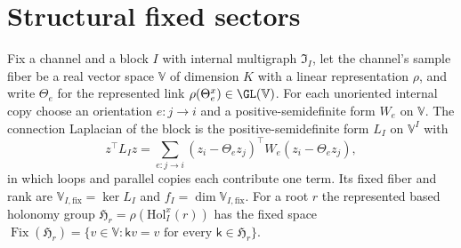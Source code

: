 \section{Structural fixed sectors}
\label{sec:cg-partial}

Fix a channel and a block $I$ with internal multigraph $\mathfrak I_I$, let the channel's sample fiber be
a real vector space $\mathbb V$ of dimension $K$ with a linear representation $\rho$, and write $\Theta_e$ for the
represented link $\rho(\Theta^x_e)\in\GL(\mathbb V)$. For each unoriented internal copy choose an orientation
$e:j\to i$ and a positive-semidefinite form $W_e$ on $\mathbb V$. The connection Laplacian of the block is the
positive-semidefinite form $L_I$ on $\mathbb V^I$ with
\begin{equation}
z^\top L_Iz=\sum_{e:j\to i}(z_i-\Theta_ez_j)^\top W_e(z_i-\Theta_ez_j),
\label{eq:cg-connection-laplacian-energy}
\end{equation}
in which loops and parallel copies each contribute one term. Its fixed fiber and rank are
$\mathbb V_{I,\mathrm{fix}}=\ker L_I$ and $f_I=\dim\mathbb V_{I,\mathrm{fix}}$. For a root $r$ the represented based holonomy group
$\mathfrak H_r=\rho(\mathrm{Hol}^x_I(r))$ has the fixed space
$\operatorname{Fix}(\mathfrak H_r)=\{v\in \mathbb V:\mathsf kv=v\text{ for every }\mathsf k\in\mathfrak H_r\}$.

